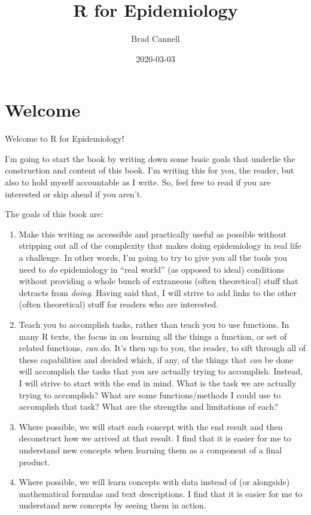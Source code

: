 \documentclass[]{book}
\title{R for Epidemiology}
\author{Brad Cannell}
\date{2020-03-03}
\begin{document}
\maketitle

{
\setcounter{tocdepth}{1}
\tableofcontents
}
\hypertarget{welcome}{%
\chapter*{Welcome}\label{welcome}}

Welcome to R for Epidemiology!

I'm going to start the book by writing down some basic goals that underlie the construction and content of this book. I'm writing this for you, the reader, but also to hold myself accountable as I write. So, feel free to read if you are interested or skip ahead if you aren't.

The goals of this book are:

\begin{enumerate}
\def\labelenumi{\arabic{enumi}.}
\item
  Make this writing as accessible and practically useful as possible without stripping out all of the complexity that makes doing epidemiology in real life a challenge. In other words, I'm going to try to give you all the tools you need to \emph{do} epidemiology in ``real world'' (as opposed to ideal) conditions without providing a whole bunch of extraneous (often theoretical) stuff that detracts from \emph{doing}. Having said that, I will strive to add links to the other (often theoretical) stuff for readers who are interested.
\item
  Teach you to accomplish tasks, rather than teach you to use functions. In many R texts, the focus in on learning all the things a function, or set of related functions, \emph{can} do. It's then up to you, the reader, to sift through all of these capabilities and decided which, if any, of the things that \emph{can} be done will accomplish the tasks that you are actually trying to accomplish. Instead, I will strive to start with the end in mind. What is the task we are actually trying to accomplish? What are some functions/methods I could use to accomplish that task? What are the strengths and limitations of each?
\item
  Where possible, we will start each concept with the end result and then deconstruct how we arrived at that result. I find that it is easier for me to understand new concepts when learning them as a component of a final product.
\item
  Where possible, we will learn concepts with data instead of (or alongside) mathematical formulas and text descriptions. I find that it is easier for me to understand new concepts by seeing them in action.
\end{enumerate}
\end{document}

